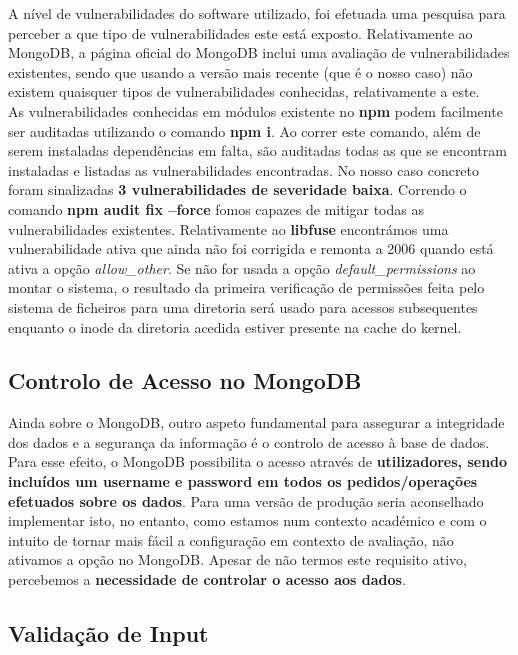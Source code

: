 A nível de vulnerabilidades do software utilizado, foi efetuada uma pesquisa para perceber a que tipo de vulnerabilidades este está exposto. Relativamente ao MongoDB, a página oficial do MongoDB inclui uma avaliação de vulnerabilidades existentes, sendo que usando a versão mais recente (que é o nosso caso) não existem quaisquer tipos de vulnerabilidades conhecidas, relativamente a este.\\
As vulnerabilidades conhecidas em módulos existente no \textbf{npm} podem facilmente ser auditadas utilizando o comando \textbf{npm i}. Ao correr este comando, além de serem instaladas dependências em falta, são auditadas todas as que se encontram instaladas e listadas as vulnerabilidades encontradas. No nosso caso concreto foram sinalizadas \textbf{3 vulnerabilidades de severidade baixa}. Correndo o comando \textbf{npm audit fix --force} fomos capazes de mitigar todas as vulnerabilidades existentes.
Relativamente ao \textbf{libfuse} encontrámos uma vulnerabilidade ativa que ainda não foi corrigida e remonta a 2006 quando está ativa a opção \textit{allow\_other}. Se não for usada a opção \textit{default\_permissions} ao montar o sistema, o resultado da primeira verificação de permissões feita pelo sistema de ficheiros para uma diretoria será usado para acessos subsequentes enquanto o inode da diretoria acedida estiver presente na cache do kernel.

\subsection{Controlo de Acesso no MongoDB}

Ainda sobre o MongoDB, outro aspeto fundamental para assegurar a integridade dos dados e a segurança da informação é o controlo de acesso à base de dados. Para esse efeito, o MongoDB possibilita o acesso através de \textbf{utilizadores, sendo incluídos um username e password em todos os pedidos/operações efetuados sobre os dados}. Para uma versão de produção seria aconselhado implementar isto, no entanto, como estamos num contexto académico e com o intuito de tornar mais fácil a configuração em contexto de avaliação, não ativamos a opção no MongoDB. Apesar de não termos este requisito ativo, percebemos a \textbf{necessidade de controlar o acesso aos dados}.

\subsection{Validação de Input}

